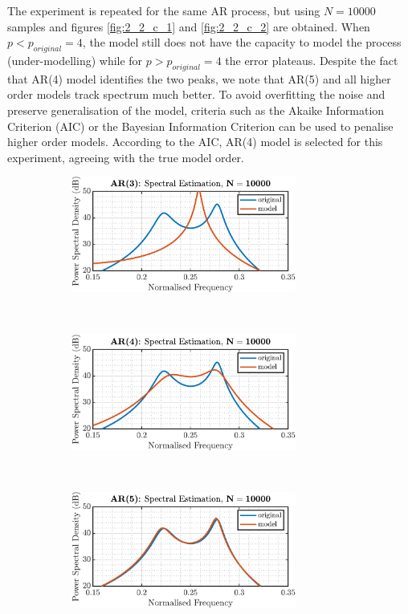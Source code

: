 \begin{enumerate}[label=\alph*), leftmargin=*]
The experiment is repeated for the same AR process, but using $N = 10000$ samples and figures \ref{fig:2_2_c_1} and \ref{fig:2_2_c_2} are obtained.
When $p < p_{original} = 4$, the model still does not have the capacity to model the process (under-modelling) while for $p > p_{original} = 4$ the error plateaus.
Despite the fact that AR(4) model identifies the two peaks, we note that AR(5) and all higher order models track spectrum much better. To avoid overfitting the noise
and preserve generalisation of the model, criteria such as the Akaike Information Criterion (AIC) or the Bayesian Information Criterion can be used to penalise higher order models.
According to the AIC, AR(4) model is selected for this experiment, agreeing with the true model order.

\begin{figure}[h]
    \centering
    \begin{subfigure}{0.49\textwidth}
        \centering
        \includegraphics[height=1.5in]{report/parametric-and-line-spectra/spectrum-of-autoregressive-processes/assets/c/ar_3}
    \end{subfigure}
    ~ 
    \begin{subfigure}{0.49\textwidth}
        \centering
        \includegraphics[height=1.5in]{report/parametric-and-line-spectra/spectrum-of-autoregressive-processes/assets/c/ar_4}
    \end{subfigure}
    ~
    ~
    \begin{subfigure}{0.49\textwidth}
        \centering
        \includegraphics[height=1.5in]{report/parametric-and-line-spectra/spectrum-of-autoregressive-processes/assets/c/ar_5}

\end{subfigure}
\end{figure}
\end{enumerate}
